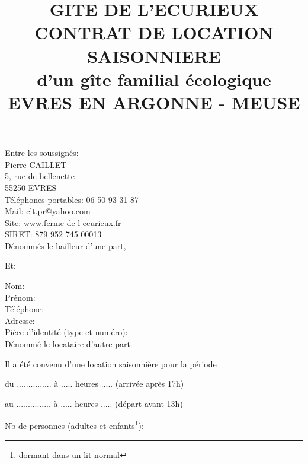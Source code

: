 \documentclass[a4paper,11pt]{article}
\title{GITE DE L'ECURIEUX\\CONTRAT DE LOCATION SAISONNIERE\\d’un gîte familial écologique\\EVRES EN ARGONNE - MEUSE}
\begin{document}
\date{}
\maketitle

\center Entre les soussignés:\\
\flushleft 
Pierre CAILLET\\
5, rue de bellenette\\
55250 EVRES\\                                                                                         
Téléphones portables: 06 50 93 31 87  \\
Mail: clt.pr@yahoo.com\\
Site: www.ferme-de-l-ecurieux.fr\\
SIRET: 879 952 745 00013\\


\vspace{0.5cm}
Dénommés le bailleur d’une part,                            

\center Et:

\flushleft
Nom:\\
Prénom:\\
Téléphone:\\
Adresse:\\
Pièce d'identité (type et numéro):\\

\vspace{0.5cm}
Dénommé le locataire d'autre part.



\flushleft
Il a été convenu d'une location saisonnière pour la période
\vspace{0.5cm}

du   ...............   à .....    heures .....    (arrivée après 17h)
\vspace{0.5cm}

au   ...............   à .....    heures .....   (départ avant 13h)
\vspace{0.5cm}

Nb de personnes (adultes et enfants\footnote{dormant dans un lit normal}): 
\vspace{0.5cm}

\newpage{}




\vspace{0.5cm}
\end{document}
